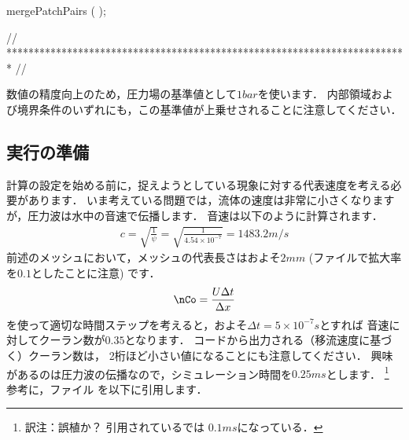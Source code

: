 \begin{OFverbatim}
mergePatchPairs
(
);

// ************************************************************************* //
\end{OFverbatim}
数値の精度向上のため，圧力場の基準値として$1\unit{bar}$を使います．
内部領域および境界条件のいずれにも，この基準値が上乗せされることに注意してください．


\subsection{実行の準備}
\label{ssec:3.4.3}
計算の設定を始める前に，捉えようとしている現象に対する代表速度を考える必要があります．
いま考えている問題では，流体の速度は非常に小さくなりますが，圧力波は水中の音速で伝播します．
音速は以下のように計算されます．
\begin{align}
 \label{eq:3.17}
 c = \sqrt{\frac{1}{\psi}}
 = \sqrt{\frac{1}{4.54 \times 10^{-7}}}
 = 1483.2 \unit{m/s}
\end{align}
前述のメッシュにおいて，メッシュの代表長さはおよそ$2 \unit{mm}$
(ファイルで拡大率を$0.1$としたことに注意) です．
\begin{align}
 \label{eq:3.18}
 \nCo = \frac{U\Delta t}{\Delta x}
\end{align}
を使って適切な時間ステップを考えると，およそ$\Delta t = 5 \times 10^{-7} \unit{s}$とすれば
音速に対してクーラン数が$0.35$となります．
コードから出力される（移流速度に基づく）クーラン数は，
2桁ほど小さい値になることにも注意してください．
興味があるのは圧力波の伝播なので，シミュレーション時間を$0.25 \unit{ms}$とします．%
\footnote{訳注：誤植か？ 引用されているでは
$0.1 \unit{ms}$になっている．}%
参考に，ファイル
%
を以下に引用します．

